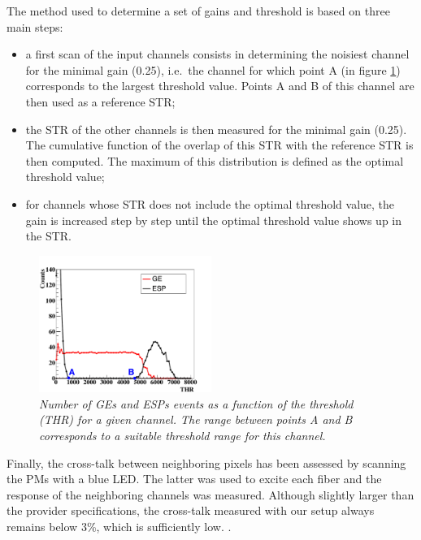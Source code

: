 \documentclass[a4paper,11pt]{article}
\begin{document}
The method used to determine a set of gains and threshold is based on three main steps:
\begin{itemize}
	\item a first scan of the input channels consists in determining the noisiest channel for the minimal gain (0.25), i.e.~the channel for which point A (in figure \ref{fig:S_Curve}) corresponds to the largest threshold value. Points A and B of this channel are then used as a reference STR;
	\item the STR of the other channels is then measured for the minimal gain (0.25). The cumulative function of the overlap of this STR with the reference STR is then computed. The maximum of this distribution is defined as the optimal threshold value;
	\item for channels whose STR does not include the optimal threshold value, the gain is increased step by step until the optimal threshold value shows up in the STR.
\end{itemize}

\begin{figure}[htb]
\centering
\includegraphics[width=0.5\textwidth]{figures/S_Curve_Thr_suitable_rangeAB.pdf}
\caption{\small{\textit{Number of GEs and ESPs events as a function of the threshold (THR) for a given channel. The range between points A and B corresponds to a suitable threshold range for this channel.}}}
\label{fig:S_Curve}
\end{figure}

Finally, the cross-talk between neighboring pixels has been assessed by scanning the PMs with a blue LED. The latter was used to excite each fiber and the response of the neighboring channels was measured. Although slightly larger than the provider specifications, the cross-talk measured with our setup always remains below 3\%, which is sufficiently low. \cite{FontanaPhD}.
\end{document}
